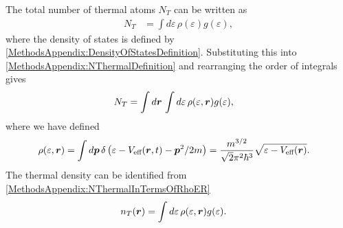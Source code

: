 The total number of thermal atoms $N_T$ can be written as
\begin{align}
    N_T &= \int d\varepsilon\, \rho(\varepsilon) g(\varepsilon),
    \label{MethodsAppendix:NThermalDefinition}
\end{align}
where the density of states is defined by \eqref{MethodsAppendix:DensityOfStatesDefinition}.  Substituting this into \eqref{MethodsAppendix:NThermalDefinition} and rearranging the order of integrals gives
\begin{align}
    N_T &= \int d \vect{r}\, \int d\varepsilon\, \rho(\varepsilon, \vect{r}) g(\varepsilon),
    \label{MethodsAppendix:NThermalInTermsOfRhoER}
\end{align}
where we have defined
\begin{align}
    \rho(\varepsilon, \bm{r}) &= \int d \bm{p}\, \delta\left(\varepsilon - V_\text{eff}(\bm{r}, t) - \bm{p}^2/2m\right) = \frac{m^{3/2}}{\sqrt{2} \pi^2 \hbar^3} \sqrt{\varepsilon - V_\text{eff}(\bm{r})}.
\end{align}
The thermal density can be identified from \eqref{MethodsAppendix:NThermalInTermsOfRhoER}
\begin{align}
    n_T(\vect{r}) &= \int d\varepsilon\, \rho(\varepsilon, \vect{r}) g(\varepsilon).
    \label{MethodsAppendix:nThermalInTermsOfRhoER}
\end{align}

